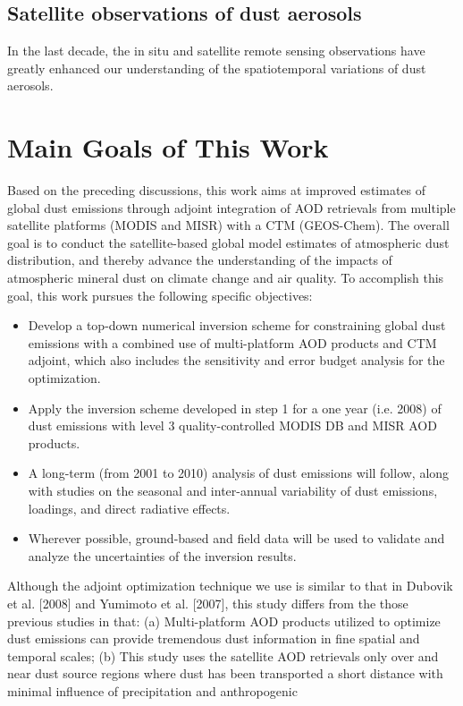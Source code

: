 \subsection{Satellite observations of dust aerosols}

 In the last decade, the in situ and satellite remote sensing observations 
 have greatly enhanced our understanding of the spatiotemporal variations
 of dust aerosols. 

\section{Main Goals of This Work}

 Based on the preceding discussions, this work aims at improved estimates of 
 global dust emissions through adjoint integration of AOD retrievals 
 from multiple satellite platforms (MODIS and MISR) with a CTM (GEOS-Chem). 
 The overall goal is to conduct the satellite-based global model estimates 
 of atmospheric dust distribution, and thereby advance the understanding of 
 the impacts of atmospheric mineral dust on climate change and air quality. 
 To accomplish this goal, this work pursues the following specific objectives:
 \begin{itemize}
 \item Develop a top-down numerical inversion scheme for constraining global dust emissions with a combined use of multi-platform AOD products and CTM adjoint, which also includes the sensitivity and error budget analysis for the optimization.
 \item Apply the inversion scheme developed in step 1 for a one year (i.e. 2008) of dust emissions with level 3 quality-controlled MODIS DB and MISR AOD products.
 \item A long-term (from 2001 to 2010) analysis of dust emissions will follow, along with studies on the seasonal and inter-annual variability of dust emissions, loadings, and direct radiative effects.
 \item Wherever possible, ground-based and field data will be used to validate and analyze the uncertainties of the inversion results.
 \end{itemize}
Although the adjoint optimization technique we use is similar to that in Dubovik et
al. [2008] and Yumimoto et al. [2007], this study differs from the those previous studies in that: (a) Multi-platform AOD products utilized to optimize dust emissions can provide tremendous dust information in fine spatial and temporal scales; (b) This study uses the satellite AOD retrievals only over and near dust source regions where dust has been transported a short distance with minimal influence of precipitation and anthropogenic
